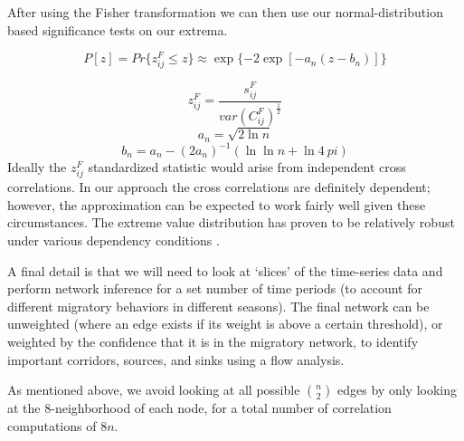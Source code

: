 After using the Fisher transformation we can then use our normal-distribution based significance tests on our extrema.

\[ P[z] = Pr\{z_{ij}^F \leq z\} \approx \exp\{-2 \exp [-a_n(z-b_n)]\} \]


\[ z_{ij}^F=\frac{s_{ij}^F}{var(C_{ij}^F)^\frac{1}{2}} \]
\[ a_n = \sqrt{2 \ln n} \]
\[ b_n = a_n - (2a_n)^{-1}(\ln \ln n + \ln 4\ pi) \]
Ideally the $z_{ij}^F$ standardized statistic would arise from independent cross correlations.  
In our approach the cross correlations are definitely dependent; however, the approximation can be expected to work fairly well given these circumstances.
The extreme value distribution has proven to be relatively robust under various dependency conditions \cite{Leadbetter83}. 

A final detail is that we will need to look at `slices' of the time-series data and perform network inference for a set number of time periods (to account for different migratory behaviors in different seasons). The final network can be unweighted (where an edge exists if its weight is above a certain threshold), or weighted by the confidence that it is in the migratory network, to identify important corridors, sources, and sinks using a flow analysis. 

As mentioned above, we avoid looking at all possible $n \choose 2$ edges by only looking at the 8-neighborhood of each node, for a total number of correlation computations of $8n$.
